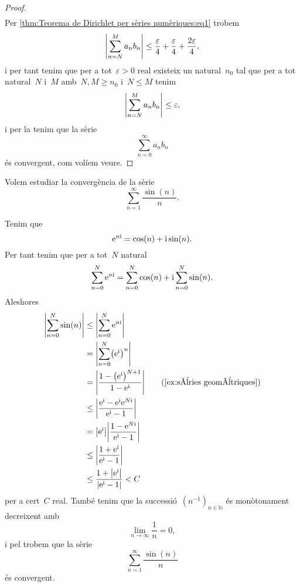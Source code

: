 \documentclass[../../main.tex]{subfiles}
\begin{document}
\begin{proof}
\begin{align*}
        \end{align*}
        Per \eqref{thm:Teorema de Dirichlet per sèries numèriques:eq1} trobem
        \[
            \abs{\sum_{n=N}^{M}a_{n}b_{n}}\leq\frac{\varepsilon}{4}+\frac{\varepsilon}{4}+\frac{2\varepsilon}{4},
        \]
        i per tant tenim que per a tot~\(\varepsilon>0\) real existeix un natural~\(n_{0}\) tal que per a tot natural~\(N\) i~\(M\) amb~\(N,M\geq n_{0}\) i~\(N\leq M\) tenim
        \[
            \abs{\sum_{n=N}^{M}a_{n}b_{n}}\leq\varepsilon,
        \]
        i per la  tenim que la sèrie
        \[
            \sum_{n=0}^{\infty}a_{n}b_{n}
        \]
        és convergent, com volíem veure.
    \end{proof}
    \begin{example}%
        \label{ex:Teorema de Dirichlet per sèries numèriques}
        Volem estudiar la convergència de la sèrie
        \[
            \sum_{n=1}^{\infty}\frac{\sin(n)}{n}.
        \]
    \end{example}
    \begin{solution} %
        Tenim que
        \[
            \mathrm{e}^{n\mathrm{i}}=\cos(n)+\mathrm{i}\sin(n).
        \]
        Per tant tenim que per a tot~\(N\) natural
        \[
            \sum_{n=0}^{N}\mathrm{e}^{n\mathrm{i}}=\sum_{n=0}^{N}\cos(n)+\mathrm{i}\sum_{n=0}^{N}\sin(n).
        \]
        Aleshores
        \begin{align*}
            \abs{\sum_{n=0}^{N}\sin(n)}&\leq\abs{\sum_{n=0}^{N}\e^{n\iu}} \\
            &=\abs{\sum_{n=0}^{N}\left(\e^{\iu}\right)^{n}} \\
            &=\abs{\frac{1-\left(\e^{\iu}\right)^{N+1}}{1-\e^{\iu}}} \tag{\ref{ex:sèries geomètriques}}\\
            &\leq\abs{\frac{\e^{\iu}-\e^{\iu}\e^{N\iu}}{\e^{\iu}-1}} \\
            &=\abs{\e^{\iu}}\abs{\frac{1-\e^{N\iu}}{\e^{\iu}-1}} \\
            &\leq\abs{\frac{1+\e^{\iu}}{\e^{\iu}-1}} \\
            &\leq\frac{1+\abs{\e^{\iu}}}{\abs{\e^{\iu}-1}}<C \\
        \end{align*}
        per a cert~\(C\) real.
        També tenim que la successió~\((n^{-1})_{n\in\mathbb{N}}\) és monòtonament decreixent amb
        \[
            \lim_{n\to\infty}\frac{1}{n}=0,
        \]
        i pel  trobem que la sèrie
        \[
            \sum_{n=1}^{\infty}\frac{\sin(n)}{n}
        \]
        és convergent.
    \end{solution} %
\end{document}
